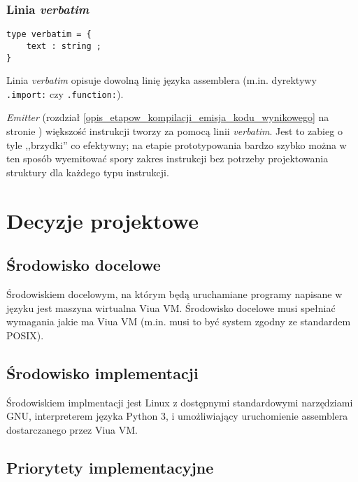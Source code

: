 \subsubsection{Linia \emph{verbatim}}
\label{diagram_klas_linia_verbatim}

\begin{small}
\begin{lstlisting}
type verbatim = {
    text : string ;
}
\end{lstlisting}
\end{small}

Linia \emph{verbatim} opisuje dowolną linię języka assemblera (m.in. dyrektywy \texttt{.import:} czy
\texttt{.function:}).

\emph{Emitter} (rozdział \ref{opis_etapow_kompilacji_emisja_kodu_wynikowego} na stronie
\pageref{opis_etapow_kompilacji_emisja_kodu_wynikowego}) większość instrukcji tworzy za pomocą linii
\emph{verbatim}. Jest to zabieg o tyle ,,brzydki'' co efektywny; na etapie prototypowania bardzo szybko
można w ten sposób wyemitować spory zakres instrukcji bez potrzeby projektowania struktury dla każdego typu
instrukcji.

\section{Decyzje projektowe}

\subsection{Środowisko docelowe}

Środowiskiem docelowym, na którym będą uruchamiane programy napisane w języku
\ViuAct\phantom{} jest maszyna wirtualna Viua VM. Środowisko docelowe musi
spełniać wymagania jakie ma Viua VM (m.in. musi to być system zgodny ze
standardem POSIX).

\subsection{Środowisko implementacji}

Środowiskiem implmentacji jest Linux z dostępnymi standardowymi narzędziami GNU,
interpreterem języka Python 3, i umożliwiający uruchomienie assemblera
dostarczanego przez Viua VM.

\subsection{Priorytety implementacyjne}

